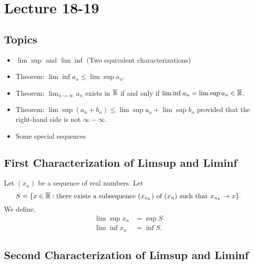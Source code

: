 \documentclass[a4paper]{article}
\begin{document}
\section{Lecture 18-19}


\subsection{Topics}

\begin{itemize}
    \item \( \lim \sup  \) and \( \lim \inf \) (Two equivalent characterizations)
    \item Theorem: \( \lim \inf {a}_{n} \leq \lim \sup {a}_{n}  \).
    \item Theorem: \( \lim_{ n \to \infty  }  {a}_{n} \) exists in \( \overline{\mathbb{R}} \) if and only if \( \lim \inf  {a}_{n} = \lim \sup {a}_{n} \in \overline{\R}\).
    \item Theorem: \( \lim \sup ({a}_{n} + {b}_{n}) \leq \lim \sup {a}_{n} + \lim \sup  {b}_{n}  \) provided that the right-hand side is not \( \infty  - \infty   \).
    \item Some special sequences
\end{itemize}

\subsection{First Characterization of Limsup and Liminf}

Let \( ({x}_{n}) \) be a sequence of real numbers. Let 
\[  S = \{ x \in \overline{\mathbb{R} }  : \text{there exists a subsequence \( ({x}_{{n}_{k }}) \) of \( ({x}_{n}) \) such that \( {x}_{{n}_{k }} \to x  \)} \}.  \]
We define,
\begin{align*}
    \lim \sup {x}_{n} &= \sup S  \\
    \lim \inf {x}_{n} &= \inf S.
\end{align*}

\subsection{Second Characterization of Limsup and Liminf}
\end{document}
